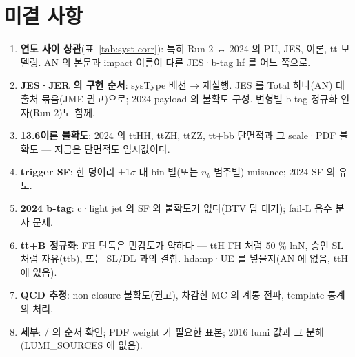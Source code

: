 \section{미결 사항}\label{sec:syst-open}

\begin{openq}
\begin{enumerate}
\item \textbf{연도 사이 상관}(표~\ref{tab:syst-corr}): 특히 Run 2 ↔ 2024 의 PU, JES, 이론, tt 모델링. AN 의 본문과 impact 이름이 다른 JES·b-tag hf 를 어느 쪽으로.
\item \textbf{JES·JER 의 구현 순서}: sysType 배선 → 재실행. JES 를 Total 하나(AN) 대 출처 묶음(JME 권고)으로; 2024 payload 의 불확도 구성.
  변형별 b-tag 정규화 인자(Run 2)도 함께.
\item \textbf{13.6\TeV 이론 불확도}: 2024 의 ttHH, ttZH, ttZZ, tt+bb 단면적과 그 scale·PDF 불확도 — 지금은 단면적도 임시값이다.
\item \textbf{trigger SF}: 한 덩어리 ±1$\sigma$ 대 bin 별(또는 $n_b$ 범주별) nuisance; 2024 SF 의 유도.
\item \textbf{2024 b-tag}: c·light jet 의 SF 와 불확도가 없다(BTV 답 대기); fail-L 음수 분자 문제.
\item \textbf{tt+B 정규화}: FH 단독은 민감도가 약하다 — ttH FH 처럼 50 \% lnN, 승인 SL 처럼 자유(ttb), 또는 SL/DL 과의 결합. hdamp·UE 를 넣을지(AN 에 없음, ttH 에 있음).
\item \textbf{QCD 추정}: non-closure 불확도(권고), 차감한 MC 의 계통 전파, template 통계의 처리.
\item \textbf{세부}: / 의 순서 확인; PDF weight 가 필요한 표본; 2016 lumi 값과 그 분해(LUMI\_SOURCES 에 없음).
\end{enumerate}
\end{openq}
